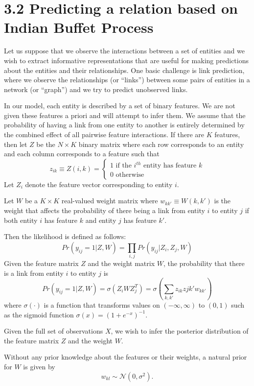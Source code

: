 \documentclass[]{article}
\begin{document}
\newpage


\section*{3.2 Predicting a relation based on Indian Buffet Process}
Let us suppose that we observe the interactions between a set of entities and we wish to extract informative representations that are useful for making predictions about the entities and their relationships. One basic challenge is link prediction, where we observe the relationships (or “links”) between some pairs of entities in a network (or “graph”) and we try to predict unobserved links. 

In our model, each entity is described by a set of binary features. We are not given these features a priori and will attempt to infer them. We assume that the probability of having a link from one entity to another is entirely determined by the combined effect of all pairwise feature interactions. If there are $K$ features, then let $Z$ be the $N \times K$ binary matrix where each row corresponds to an entity and each column corresponds to a feature such that
$$ 
z_{ik} \equiv Z(i,k) = 
\begin{cases}
	1 \text{\ \ \ if the $i^{th}$ entity has feature $k$} \\
	0 \text{\ \ \ otherwise}
\end{cases}
$$
Let $Z_i$ denote the feature vector corresponding to entity $i$.

Let $W$ be a $K \times K$ real-valued weight matrix where $w_{kk'} \equiv W(k, k')$ is the weight that affects the probability of there being a link from entity $i$ to entity $j$ if both entity $i$ has feature $k$ and entity $j$ has feature $k'$.

Then the likelihood is defined as follows:
$$
Pr(y_{ij}=1|Z,W) = \prod_{i,j}Pr(y_{ij}|Z_i,Z_j,W)
$$
Given the feature matrix $Z$ and the weight matrix $W$, the probability that there is a link from entity $i$ to entity $j$ is
$$
Pr(y_{ij}=1|Z,W) = \sigma(Z_iWZ_j^T) = \sigma(\sum_{k,k'}z_{ik}z{jk'}w_{kk'}) 
$$
where $\sigma(\cdot)$ is a function that transforms values on $(-\infty, \infty)$ to $(0,1)$ such as the sigmoid function $\sigma(x) = (1+e^{-x})^{-1}$.

Given the full set of observations $X$, we wish to infer the posterior distribution of the feature matrix $Z$ and the weight $W$.

Without any prior knowledge about the features or their weights, a natural prior for $W$ is given by 
$$
w_{kl} \sim \mathcal{N}(0,\sigma^2).
$$
\end{document}
